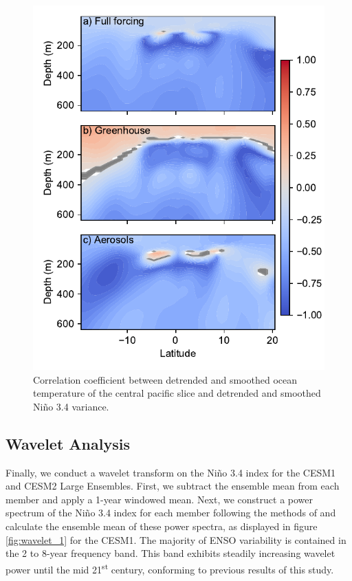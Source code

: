 \documentclass[11pt]{article}
\begin{document}
\begin{figure}[htbp]
\centering
\includegraphics[width=.9\linewidth]{../../data/figures/tempcep.pdf}
\caption{\label{fig:tempcep}Correlation coefficient between detrended and smoothed ocean temperature of the central pacific slice and detrended and smoothed Niño 3.4 variance.}
\end{figure}

\subsection{Wavelet Analysis}
\label{sec:org653115c}
Finally, we conduct a wavelet transform on the Niño 3.4 index for the CESM1 and CESM2 Large Ensembles. First, we subtract the ensemble mean from each member and apply a 1-year windowed mean. Next, we construct a power spectrum of the Niño 3.4 index for each member following the methods of \cite{torrence1998practical} and calculate the ensemble mean of these power spectra, as displayed in figure \ref{fig:wavelet_1} for the CESM1. The majority of ENSO variability is contained in the 2 to 8-year frequency band. This band exhibits steadily increasing wavelet power until the mid 21\textsuperscript{st} century, conforming to previous results of this study.
\end{document}
